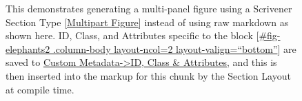 \documentclass[
  12pt,
  a4paper,
  oneside,
  numbers=noenddot,
  titlepage,
  toclink=all,
  toc=bibliography]{scrbook}
\theoremstyle{definition}
\theoremstyle{definition}
\theoremstyle{definition}
\theoremstyle{plain}
\theoremstyle{plain}
\theoremstyle{plain}
\theoremstyle{plain}
\theoremstyle{plain}
\theoremstyle{remark}
\begin{document}
\begin{figure}

\begin{minipage}[t]{0.45\linewidth}

{\centering 


}

\end{minipage}%
%
\begin{minipage}[t]{0.56\linewidth}

{\centering 


}

\end{minipage}%

\caption{\label{fig-scriv23}This demonstrates generating a multi-panel
figure using a Scrivener Section Type {[}\ul{Multipart Figure}{]}
instead of using raw markdown as shown here. ID, Class, and Attributes
specific to the block {[}\ul{\#fig-elephants2 .column-body layout-ncol=2
layout-valign=\enquote{bottom}}{]} are saved to \ul{Custom
Metadata-\textgreater ID, Class \& Attributes}, and this is then
inserted into the markup for this chunk by the Section Layout at compile
time.}

\end{figure}
\end{document}
